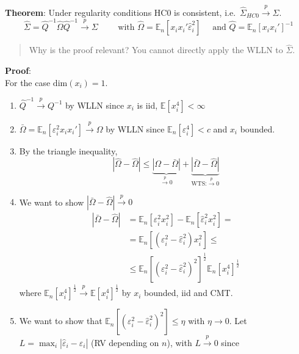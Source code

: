 \documentclass[12pt,]{book}
\providecommand{\tightlist}{%
  \setlength{\itemsep}{0pt}\setlength{\parskip}{0pt}}
\begin{document}
\textbf{Theorem}:
Under regularity conditions HC0 is consistent, i.e.~\(\hat{\Sigma} _ {HC0} \overset{p}{\to} \Sigma\).
\[
    \hat{\Sigma} = \hat{Q}^{-1} \hat{\Omega} \hat{Q}^{-1} \xrightarrow{p} \Sigma \qquad  \text{ with } \hat{\Omega} = \mathbb E_n [x_i x_i'     \hat{\varepsilon}_i^2] \quad \text{ and } \hat{Q} = \mathbb E_n [x_i x_i']^{-1} 
\]

\begin{quote}
Why is the proof relevant? You cannot directly apply the WLLN to \(\hat \Sigma\).
\end{quote}

\textbf{Proof}:\\
For the case \(\mathrm{dim}(x_i) =1\).

\begin{enumerate}
\def\labelenumi{\arabic{enumi}.}
\tightlist
\item
  \(\hat{Q}^{-1} \xrightarrow{p} Q^{-1}\) by WLLN since \(x_i\) is iid, \(\mathbb E[x_i^4] < \infty\)
\item
  \(\bar{\Omega} = \mathbb E_n [\varepsilon_i^2 x_i x_i'] \xrightarrow{p} \Omega\) by WLLN since \(\mathbb E_n [\varepsilon_i^4] < c\) and \(x_i\) bounded.
\item
  By the triangle inequality,
  \[
       | \hat{\Omega} - \hat{\Omega}| \leq \underbrace{|\Omega - \bar{\Omega}|} _ {\overset{p}{\to} 0} + \underbrace{|\bar{\Omega} - \hat{\Omega}|} _ {\text{WTS:} \overset{p}{\to} 0} 
   \]
\item
  We want to show \(|\bar{\Omega} - \hat{\Omega}| \overset{p}{\to} 0\)
  \[
   \begin{aligned}
       |\bar{\Omega} - \hat{\Omega}| &= \mathbb E_n [\varepsilon_i^2 x_i^2] - \mathbb E_n [\hat{\varepsilon}_i^2 x_i^2]  = \\
       &= \mathbb E_n [\left( \varepsilon_i^2 - \hat{\varepsilon}_i^2 \right) x_i^2] \leq \\
       & \leq \mathbb E_n \left[ \left( \varepsilon_i^2 - \hat{\varepsilon}_i^2 \right)^2\right]^{\frac{1}{2}} \mathbb E_n [x_i^4]^{\frac{1}{2}}
   \end{aligned}
   \]
  where \(\mathbb E_n [x_i^4]^{\frac{1}{2}} \xrightarrow{p} \mathbb E [x_i^4]^{\frac{1}{2}}\) by \(x_i\) bounded, iid and CMT.
\item
  We want to show that \(\mathbb E_n \left[ \left( \varepsilon_i^2 - \hat{\varepsilon}_i^2 \right)^2\right] \leq \eta\) with \(\eta \rightarrow 0\).
  Let \(L = \max_i |\hat{\varepsilon}_i - \varepsilon_i|\) (RV depending on \(n\)), with \(L \xrightarrow{p} 0\) since

\end{enumerate}
\end{document}
